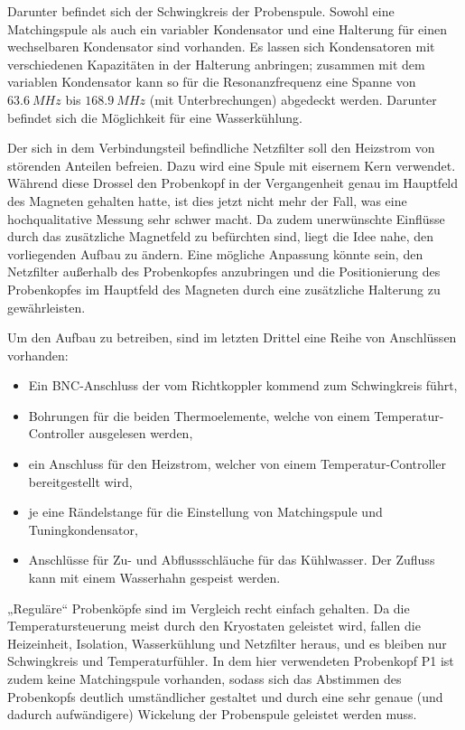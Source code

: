 Darunter befindet sich der Schwingkreis der Probenspule. Sowohl eine Matchingspule als auch ein variabler Kondensator und eine Halterung für einen wechselbaren Kondensator sind vorhanden. Es lassen sich Kondensatoren mit verschiedenen Kapazitäten in der Halterung anbringen; zusammen mit dem variablen Kondensator kann so für die Resonanzfrequenz eine Spanne von $\SI{63,6}{MHz}$ bis $\SI{168,9}{MHz}$ (mit Unterbrechungen) abgedeckt werden. Darunter befindet sich die Möglichkeit für eine Wasserkühlung.

Der sich in dem Verbindungsteil befindliche Netzfilter soll den Heizstrom von störenden Anteilen befreien. Dazu wird eine Spule mit eisernem Kern verwendet. Während diese Drossel den Probenkopf in der Vergangenheit genau im Hauptfeld des Magneten gehalten hatte, ist dies jetzt nicht mehr der Fall, was eine hochqualitative Messung sehr schwer macht. Da zudem unerwünschte Einflüsse durch das zusätzliche Magnetfeld zu befürchten sind, liegt die Idee nahe, den vorliegenden Aufbau zu ändern. Eine mögliche Anpassung könnte sein, den Netzfilter außerhalb des Probenkopfes anzubringen und die Positionierung des Probenkopfes im Hauptfeld des Magneten durch eine zusätzliche Halterung zu gewährleisten.

Um den Aufbau zu betreiben, sind im letzten Drittel eine Reihe von Anschlüssen vorhanden:
\begin{itemize}
	\item Ein BNC-Anschluss der vom Richtkoppler kommend zum Schwingkreis führt,
	\item Bohrungen für die beiden Thermoelemente, welche von einem Temperatur-Controller ausgelesen werden,
	\item ein Anschluss für den Heizstrom, welcher von einem Temperatur-Controller bereitgestellt wird,
	\item je eine Rändelstange für die Einstellung von Matching\-spu\-le und Tuningkondensator,
	\item Anschlüsse für Zu- und Abflussschläuche für das Kühlwasser. Der Zufluss kann mit einem Wasserhahn gespeist werden.
\end{itemize}

„Reguläre“ Probenköpfe sind im Vergleich recht einfach gehalten. Da die Temperatursteuerung meist durch den Kryostaten geleistet wird, fallen die Heizeinheit, Isolation, Wasserkühlung und Netzfilter heraus, und es bleiben nur Schwingkreis und Temperaturfühler. In dem hier verwendeten Probenkopf P1 ist zudem keine Matchingspule vorhanden, sodass sich das Abstimmen des Probenkopfs deutlich umständlicher gestaltet und durch eine sehr genaue (und dadurch aufwändigere) Wickelung der Probenspule geleistet werden muss.




